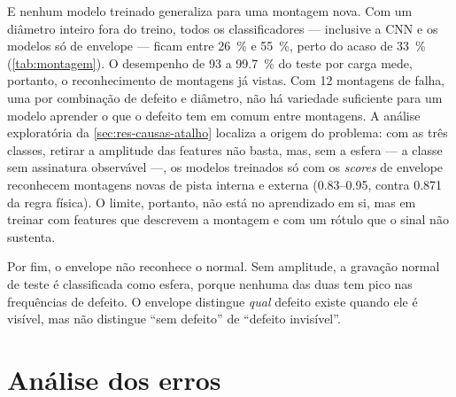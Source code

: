 E nenhum modelo treinado generaliza para uma montagem nova. Com um
diâmetro inteiro fora do treino, todos os classificadores --- inclusive a CNN e os
modelos só de envelope --- ficam entre \SI{26}{\percent} e \SI{55}{\percent}, perto
do acaso de \SI{33}{\percent} (\autoref{tab:montagem}). O desempenho de 93 a
\SI{99.7}{\percent} do teste por carga mede, portanto, o reconhecimento de
montagens já vistas. Com 12 montagens de falha, uma por combinação de defeito e
diâmetro, não há variedade suficiente para um modelo aprender o que o defeito tem
em comum entre montagens. A análise exploratória da
\autoref{sec:res-causas-atalho} localiza a origem do problema: com as três
classes, retirar a amplitude das features não basta, mas, sem a esfera --- a
classe sem assinatura observável ---, os modelos treinados só com os
\emph{scores} de envelope reconhecem montagens novas de pista interna e externa
(\numrange{0.83}{0.95}, contra \num{0.871} da regra física). O limite, portanto,
não está no aprendizado em si, mas em treinar com features que descrevem a
montagem e com um rótulo que o sinal não sustenta.

Por fim, o envelope não reconhece o normal. Sem amplitude, a gravação normal
de teste é classificada como esfera, porque nenhuma das duas tem pico nas
frequências de defeito. O envelope distingue \emph{qual} defeito existe quando
ele é visível, mas não distingue ``sem defeito'' de ``defeito invisível''.

\section{Análise dos erros}
\label{sec:erros}

